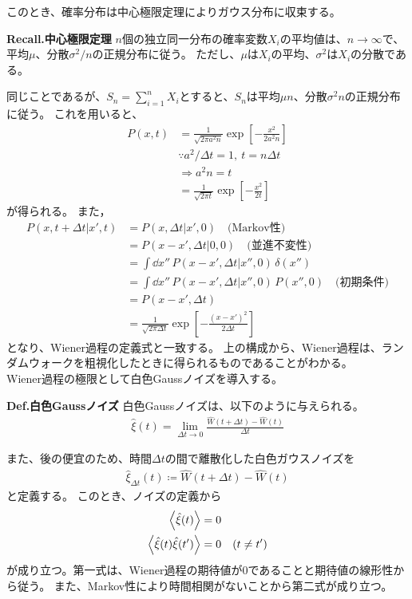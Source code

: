 \documentclass[a4paper,11pt]{jsarticle}
\numberwithin{equation}{section}
\begin{document}
このとき、確率分布は中心極限定理によりガウス分布に収束する。
\begin{itembox}[l]{\textbf{Recall.中心極限定理}}
  $n$個の独立同一分布の確率変数$X_i$の平均値は、$n \to \infty$で、平均$\mu$、分散$\sigma^2/n$の正規分布に従う。
  ただし、$\mu$は$X_i$の平均、$\sigma^2$は$X_i$の分散である。

\end{itembox}
同じことであるが、$S_n = \sum_{i=1}^n X_i$とすると、$S_n$は平均$\mu n$、分散$\sigma^2 n$の正規分布に従う。
これを用いると、
\begin{align}
  P(x, t) 
  &= \frac{1}{\sqrt{2\pi a^2 n}} \exp\left[ -\frac{x^2}{2 a^2 n} \right] \\
  &\because a^2 / \Delta t = 1,\ t = n \Delta t \\
  &\Rightarrow a^2 n = t \\
  &= \frac{1}{\sqrt{2\pi t}} \exp\left[ -\frac{x^2}{2t} \right]
\end{align}
が得られる。
また，
\begin{align}
  P(x, t + \Delta t | x', t) 
  &= P(x, \Delta t | x', 0) \quad \text{(Markov性)} \\
  &=  P(x - x', \Delta t | 0, 0) \quad \text{(並進不変性)} \\
  &=\int \dd{x''}\, P(x - x', \Delta t | x'', 0)\, \delta(x'')  \\
  &= \int \dd{x''}\, P(x - x', \Delta t | x'', 0)\, P(x'', 0) \quad \text{(初期条件)} \\
  &= P(x - x', \Delta t) \\
  &= \frac{1}{\sqrt{2\pi \Delta t}} \exp\left[ -\frac{(x - x')^2}{2 \Delta t} \right]
\end{align}
となり、Wiener過程の定義式と一致する。
上の構成から、Wiener過程は、ランダムウォークを粗視化したときに得られるものであることがわかる。\\

Wiener過程の極限として白色Gaussノイズを導入する。
\begin{itembox}[l]{\textbf{Def.白色Gaussノイズ}}
    白色Gaussノイズは、以下のように与えられる。
    \begin{align}
        \hat{\xi}(t) = \lim_{\Delta t \to 0} \frac{\hat{W}(t+\Delta t) - \hat{W}(t)}{\Delta t}
    \end{align}
\end{itembox}
また、後の便宜のため、時間$\Delta t$の間で離散化した白色ガウスノイズを
\begin{align}
    \hat{\xi}_{\Delta t}(t) \coloneq \hat{W}(t+\Delta t) - \hat{W}(t)
\end{align}
と定義する。
このとき、ノイズの定義から
\begin{align}
    \ev{\hat{\xi}(t)} &= 0 \label{eq:xi_mean} \\
    \ev{\hat{\xi}(t) \hat{\xi}(t')} &= 0 \quad (t \neq t') \label{eq:xi_correlation} \\
\end{align}
が成り立つ。第一式は、Wiener過程の期待値が0であることと期待値の線形性から従う。
また、Markov性により時間相関がないことから第二式が成り立つ。
\end{document}
